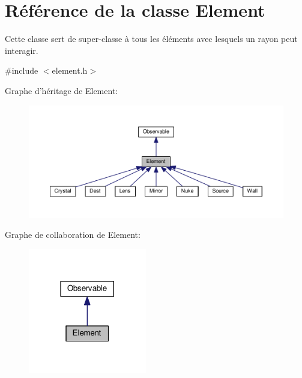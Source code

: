 \hypertarget{classElement}{\section{Référence de la classe Element}
\label{classElement}
}


Cette classe sert de super-\/classe à tous les éléments avec lesquels un rayon peut interagir.  




{\ttfamily \#include $<$element.\+h$>$}



Graphe d'héritage de Element\+:\nopagebreak
\begin{figure}[H]
\begin{center}
\leavevmode
\includegraphics[width=350pt]{d8/dd6/classElement__inherit__graph}
\end{center}
\end{figure}


Graphe de collaboration de Element\+:\nopagebreak
\begin{figure}[H]
\begin{center}
\leavevmode
\includegraphics[width=146pt]{d4/dd1/classElement__coll__graph}
\end{center}
\end{figure}
